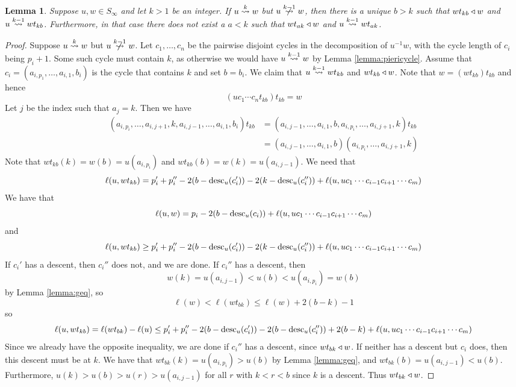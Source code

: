 \documentclass{amsart}
\newtheorem{lemma}{Lemma}[section]
\theoremstyle{definition}
\theoremstyle{remark}
\numberwithin{equation}{section}
\newcommand{\xrightsquigarrow}[2][]{%
	\mathrel{\mathop{\rightsquigarrow}\limits^{\scriptstyle #2}%
	\ifx\hfuzz#1\hfuzz\else_{\scriptstyle #1}\fi}%
}
\newcommand{\tom}[1]{\ensuremath{\xrightsquigarrow{#1}}}
\begin{document}
\begin{lemma} \label{lemma:pieriknotkn1}
Suppose $u,w\in S_\infty$ and let $k>1$ be an integer. If $u\tom{k} w$ but $u\ntom{k-1} w$, then there is a unique $b>k$ such that $wt_{kb}\triangleleft w$ and $u\tom{k-1} wt_{kb}$. Furthermore, in that case there does not exist a $a<k$ such that $wt_{ak}\triangleleft w$ and $u\tom{k-1} wt_{ak}$.
\end{lemma}
\begin{proof}
Suppose $u\tom{k} w$ but $u\ntom{k-1} w$. Let $c_1,\ldots,c_n$ be the pairwise disjoint cycles in the decomposition of $u^{-1}w$, with the cycle length of $c_i$ being $p_i+1$. Some such cycle must contain $k$, as otherwise we would have $u\tom{k-1} w$ by Lemma \ref{lemma:piericycle}. Assume that $c_i=(a_{i,p_1},\ldots,a_{i,1},b_i)$ is the cycle that contains $k$ and set $b=b_i$. We claim that $u\tom{k-1} wt_{kb}$ and $wt_{kb}\triangleleft w$. Note that $w=(wt_{kb})t_{kb}$ and hence 
$$(uc_1\cdots c_nt_{kb})t_{kb}=w$$
Let $j$ be the index such that $a_j=k$. Then we have
\begin{align*}
(a_{i,p_i},\ldots,a_{i,j+1},k,a_{i,j-1},\ldots,a_{i,1},b_i)t_{kb}&=(a_{i,j-1},\ldots,a_{i,1},b,a_{i,p_i},\ldots,a_{i,j+1},k)t_{kb}\\
&=(a_{i,j-1},\ldots,a_{i,1},b)(a_{i,p_i},\ldots,a_{i,j+1},k)
\end{align*}
Note that $wt_{kb}(k)=w(b)=u(a_{i,p_i})$ and $wt_{kb}(b)=w(k)=u(a_{i,j-1})$. We need that
$$\ell(u,wt_{kb})=p_i'+p_i''-2(b-\mathrm{desc}_u(c_i'))-2(k-\mathrm{desc}_u(c_i''))+\ell(u,uc_1\cdots c_{i-1}c_{i+1}\cdots c_m)$$
We have that
$$\ell(u,w)=p_i-2(b-\mathrm{desc}_u(c_i))+\ell(u,uc_1\cdots c_{i-1}c_{i+1}\cdots c_m)$$
and
$$\ell(u,wt_{kb})\geq p_i'+p_i''-2(b-\mathrm{desc}_u(c_i'))-2(k-\mathrm{desc}_u(c_i''))+\ell(u,uc_1\cdots c_{i-1}c_{i+1}\cdots c_m)$$
If $c_i'$ has a descent, then $c_{i}''$ does not, and we are done. If $c_i''$ has a descent, then 
$$w(k)=u(a_{i,j-1})<u(b)<u(a_{i,p_i})=w(b)$$ 
by Lemma \ref{lemma:geq}, so 
$$\ell(w)<\ell(wt_{bk})\leq \ell(w)+2(b-k)-1$$
so
$$\ell(u,wt_{kb})=\ell(wt_{bk})-\ell(u)\leq p_i'+p_i''-2(b-\mathrm{desc}_u(c_i'))-2(b-\mathrm{desc}_u(c_i''))+2(b-k)+\ell(u,uc_1\cdots c_{i-1}c_{i+1}\cdots c_m)$$
Since we already have the opposite inequality, we are done if $c_{i}''$ has a descent, since $wt_{bk}\triangleleft w$. If neither has a descent but $c_i$ does, then this descent must be at $k$. We have that $wt_{bk}(k)=u(a_{i,p_i})>u(b)$ by Lemma \ref{lemma:geq}, and $wt_{bk}(b)=u(a_{i,j-1})<u(b)$. Furthermore, $u(k)>u(b)>u(r)>u(a_{i,j-1})$ for all $r$ with $k<r<b$ since $k$ is a descent. Thus $wt_{bk}\triangleleft w$.

\end{proof}
\end{document}
